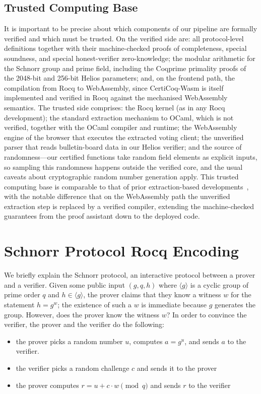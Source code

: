 \documentclass[sigconf,anonymous,review]{acmart}
\begin{document}
\subsection{Trusted Computing Base}\label{tcb}
It is important to be precise about which components of our pipeline are formally verified and which must be trusted. On the verified side are: all protocol-level definitions together with their machine-checked proofs of completeness, special soundness, and special honest-verifier zero-knowledge; the modular arithmetic for the Schnorr group and prime field, including the Coqprime primality proofs of the 2048-bit and 256-bit Helios parameters; and, on the frontend path, the compilation from Rocq to WebAssembly, since CertiCoq-Wasm is itself implemented and verified in Rocq against the mechanised WebAssembly semantics. The trusted side comprises: the Rocq kernel (as in any Rocq development); the standard extraction mechanism to OCaml, which is not verified, together with the OCaml compiler and runtime; the WebAssembly engine of the browser that executes the extracted voting client; the unverified parser that reads bulletin-board data in our Helios verifier; and the source of randomness---our certified functions take random field elements as explicit inputs, so sampling this randomness happens outside the verified core, and the usual caveats about cryptographic random number generation apply. This trusted computing base is comparable to that of prior extraction-based developments~\cite{287095}, with the notable difference that on the WebAssembly path the unverified extraction step is replaced by a verified compiler, extending the machine-checked guarantees from the proof assistant down to the deployed code.




\section{Schnorr Protocol Rocq Encoding}\label{schn_proof}
  We briefly explain the Schnorr protocol, an interactive protocol 
  between a prover and a verifier. 
  Given some public input $(g, q, h)$ where $\langle g\rangle$
  is a cyclic group of prime order $q$ and $h\in\langle g\rangle$,
  the prover claims that they know a
  witness $w$ for the statement $h = g^w$; the existence of such
  a $w$ is immediate because $g$ generates the group. However,
  does the prover know the witness $w$? In order to convince the
  verifier, the prover and the verifier do the following:
  \begin{itemize}
    \item the prover picks a random number $u$, computes $a = g^u$,
    and sends $a$ to the verifier.
    \item the verifier picks a random challenge $c$ and sends it to
    the prover
    \item the prover computes $r = u + c \cdot w \pmod q$ and sends $r$ to the
    verifier
  \end{itemize}
\end{document}
